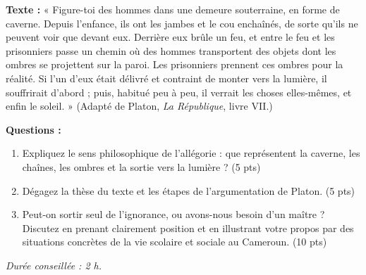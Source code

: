 \documentclass[11pt]{article}
\begin{document}
\begin{exercice}
\textbf{Texte :} « Figure-toi des hommes dans une demeure souterraine, en forme de caverne. Depuis l'enfance, ils ont les jambes et le cou enchaînés, de sorte qu'ils ne peuvent voir que devant eux. Derrière eux brûle un feu, et entre le feu et les prisonniers passe un chemin où des hommes transportent des objets dont les ombres se projettent sur la paroi. Les prisonniers prennent ces ombres pour la réalité. Si l'un d'eux était délivré et contraint de monter vers la lumière, il souffrirait d'abord ; puis, habitué peu à peu, il verrait les choses elles-mêmes, et enfin le soleil. » (Adapté de Platon, \emph{La République}, livre VII.)

\textbf{Questions :}
\begin{enumerate}
\item Expliquez le sens philosophique de l'allégorie : que représentent la caverne, les chaînes, les ombres et la sortie vers la lumière ? (5 pts)
\item Dégagez la thèse du texte et les étapes de l'argumentation de Platon. (5 pts)
\item Peut-on sortir seul de l'ignorance, ou avons-nous besoin d'un maître ? Discutez en prenant clairement position et en illustrant votre propos par des situations concrètes de la vie scolaire et sociale au Cameroun. (10 pts)
\end{enumerate}
\emph{Durée conseillée : 2 h.}
\end{exercice}
\end{document}
